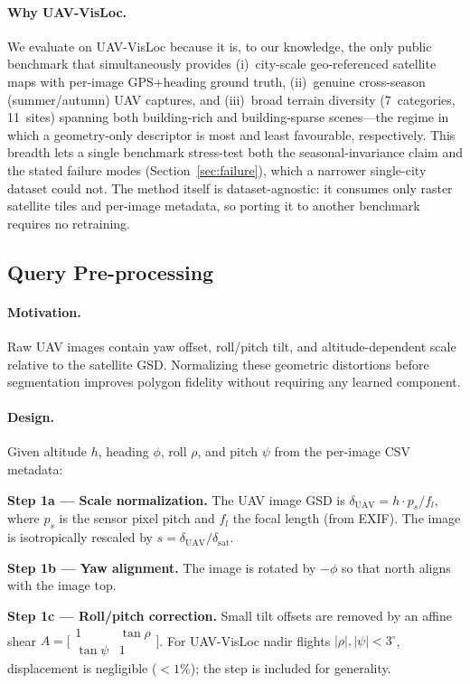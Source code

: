 \documentclass[10pt]{article}
\theoremstyle{plain}
\theoremstyle{definition}
\begin{document}
\paragraph{Why UAV-VisLoc.}
We evaluate on UAV-VisLoc because it is, to our knowledge, the only public
benchmark that simultaneously provides (i)~city-scale geo-referenced satellite
maps with per-image GPS+heading ground truth, (ii)~genuine cross-season
(summer/autumn) UAV captures, and (iii)~broad terrain diversity
(7~categories, 11~sites) spanning both building-rich and building-sparse
scenes---the regime in which a geometry-only descriptor is most and least
favourable, respectively.
This breadth lets a single benchmark stress-test both the seasonal-invariance
claim and the stated failure modes (Section~\ref{sec:failure}), which a narrower
single-city dataset could not.
The method itself is dataset-agnostic: it consumes only raster satellite tiles
and per-image metadata, so porting it to another benchmark requires no
retraining.
\subsection{Query Pre-processing}
\label{sec:preproc}

\paragraph{Motivation.}
Raw UAV images contain yaw offset, roll/pitch tilt, and altitude-dependent
scale relative to the satellite GSD.
Normalizing these geometric distortions before segmentation improves polygon
fidelity without requiring any learned component.

\paragraph{Design.}
Given altitude $h$, heading $\phi$, roll $\rho$, and pitch $\psi$ from the
per-image CSV metadata:

\noindent\textbf{Step 1a --- Scale normalization.}
The UAV image GSD is $\delta_{\mathrm{UAV}} = h \cdot p_s / f_l$, where $p_s$
is the sensor pixel pitch and $f_l$ the focal length (from EXIF).
The image is isotropically rescaled by
$s = \delta_{\mathrm{UAV}} / \delta_{\mathrm{sat}}$.

\noindent\textbf{Step 1b --- Yaw alignment.}
The image is rotated by $-\phi$ so that north aligns with the image top.

\noindent\textbf{Step 1c --- Roll/pitch correction.}
Small tilt offsets are removed by an affine shear
$A = \bigl[\begin{smallmatrix}1 & \tan\rho \\ \tan\psi & 1\end{smallmatrix}\bigr]$.
For UAV-VisLoc nadir flights $|\rho|,|\psi|<3^\circ$, displacement is
negligible ($<1\%$); the step is included for generality.
\end{document}
